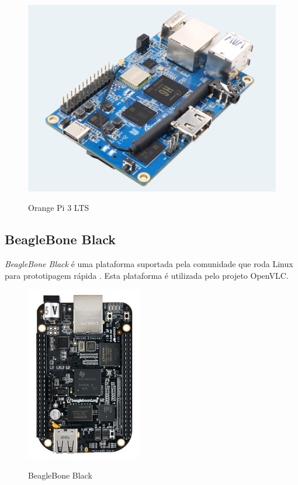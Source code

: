 \begin{figure}[!htbp]
  \caption{Orange Pi 3 LTS}
  \includegraphics[scale=0.35]{images/orange.png}
  \label{figura:orange}
\end{figure}

\newpage

\subsection{BeagleBone Black}

\textit{BeagleBone Black} é uma plataforma suportada pela comunidade que roda Linux para prototipagem rápida \cite{beaglebone}.
Esta plataforma é utilizada pelo projeto OpenVLC. \newline

\begin{figure}[!htbp]
  \caption{BeagleBone Black}
  \includegraphics[scale=0.58]{images/beaglebone.png}
  \label{figura:beagle}
\end{figure}

